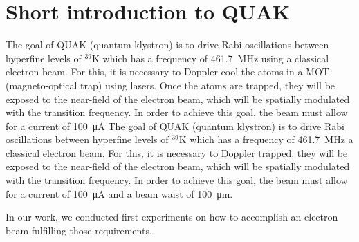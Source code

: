 
\chapter{Short introduction to QUAK}
\label{ch:Short introduction to QuaK}

The goal of QUAK (quantum klystron) is to drive Rabi oscillations between hyperfine levels of $^{39}\mathrm{K}$ which has a frequency of \SI{461.7}{\mega\hertz} \cite{tiecke:potassium-properties} using a classical electron beam. For this, it is necessary to Doppler cool the atoms in a MOT (magneto-optical trap) using lasers. Once the atoms are trapped, they will be exposed to the near-field of the electron beam, which will be spatially modulated with the transition frequency. In order to achieve this goal, the beam must allow for a current of \SI{100}{\micro\ampere}
The goal of QUAK (quantum klystron) is to drive Rabi oscillations between hyperfine levels of $^{39}\mathrm{K}$  which has a frequency of \SI{461.7}{\mega\hertz} \cite{tiecke:potassium-properties}  a classical electron beam. For this, it is necessary to Doppler  trapped, they will be exposed to the near-field of the electron beam, which will be spatially modulated with the transition frequency. In order to achieve this goal, the beam must allow for a current of \SI{100}{\micro\ampere}
and a beam waist of \SI{100}{\micro\meter}.

In our work, we conducted first experiments on how to accomplish an electron beam fulfilling those requirements.